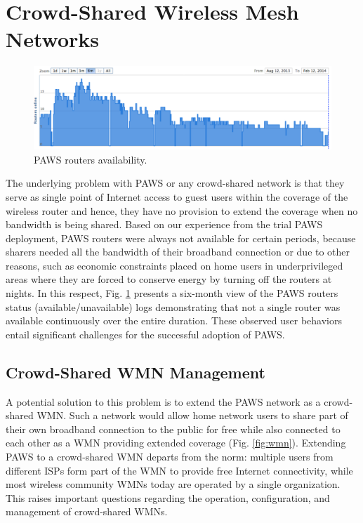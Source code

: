 \section{Crowd-Shared Wireless Mesh Networks}
\label{sec:architecture}

\begin{figure}[t]
\begin{center}
\includegraphics[width=1\linewidth]{paws-avail.pdf}  
\caption{PAWS routers availability.}
\label{fig:paws-avail}
\end{center}
\end{figure}

The underlying problem with PAWS or any crowd-shared network is that they serve as single point of Internet access to guest users within the coverage of the wireless router and hence, they have no provision to extend the coverage when no bandwidth is being shared. Based on our experience from the trial PAWS deployment, PAWS routers were always not available for certain periods, because sharers needed all the bandwidth of their broadband connection or due to other reasons, such as economic constraints placed on home users in underprivileged areas where they are forced to conserve energy by turning off the routers at nights. In this respect, Fig. \ref{fig:paws-avail} presents a six-month view of the PAWS routers status (available/unavailable) logs demonstrating that not a single router was available continuously over the entire duration. These observed user behaviors entail significant challenges for the successful adoption of PAWS. 

\subsection{Crowd-Shared WMN Management}
\label{architecture:management}

A potential solution to this problem is to extend the PAWS network as a crowd-shared WMN. Such a network would allow home network users to share part of their own broadband connection to the public for free while also connected to each other as a WMN providing extended coverage (Fig. \ref{fig:wmn}). Extending PAWS to a crowd-shared WMN departs from the norm: multiple users from different ISPs form part of the WMN to provide free Internet connectivity, while most wireless community WMNs today are operated by a single organization. This raises important questions regarding the operation, configuration, and management of crowd-shared WMNs.  

